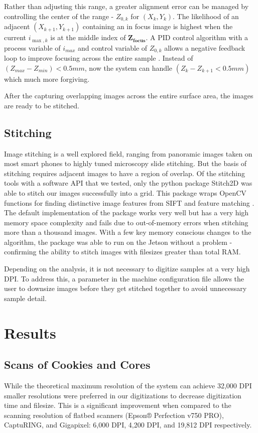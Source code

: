 \documentclass[a4paper,12pt]{article}
\begin{document}
Rather than adjusting this range, a greater alignment error can be managed by controlling the center of the range - $Z_{0,k}$ for $(X_k,Y_k)$. 
The likelihood of an adjacent $(X_{k+1}, Y_{k+1})$ containing an in focus image is highest when the current $i_{{\max,k}}$ is at the middle index of $\boldsymbol{Z_{focus}}$. 
A PID control algorithm with a process variable of $i_{max}$ and control variable of $Z_{0,k}$ allows a negative feedback loop to improve focusing across the entire sample \citep{odwyer_summary_2000}. 
Instead of $(Z_{max} - Z_{min}) < 0.5mm$, now the system can handle $(Z_{k} - Z_{k+1} < 0.5mm)$ which much more forgiving. 

After the capturing overlapping images across the entire surface area, the images are ready to be stitched.

\subsection{Stitching}

Image stitching is a well explored field, ranging from panoramic images taken on most smart phones to highly tuned microscopy slide stitching. 
But the basis of stitching requires adjacent images to have a region of overlap. 
Of the stitching tools with a software API that we tested, only the python package Stitch2D was able to stitch our images successfully into a grid. %
This package wraps OpenCV functions for finding distinctive image features from SIFT and feature matching \citep{lowe_distinctive_2004}. 
The default implementation of the package works very well but has a very high memory space complexity and fails due to out-of-memory errors when stitching more than a thousand images. %
With a few key memory conscious changes to the algorithm, the package was able to run on the Jetson without a problem - confirming the ability to stitch images with filesizes greater than total RAM. 

Depending on the analysis, it is not necessary to digitize samples at a very high DPI. To address this, a parameter in the machine configuration file 
allows the user to downsize images before they get stitched together to avoid unnecessary sample detail. 

\section{Results}
\subsection{Scans of Cookies and Cores}
While the theoretical maximum resolution of the system can achieve 32,000 DPI smaller resolutions were preferred in our digitizations to decrease digitization time and filesize.
This is a significant improvement when compared to the scanning resolution of flatbed scanners (Epson® Perfection v750 PRO), CaptuRING, and Gigapixel: 6,000 DPI, 4,200 DPI, and 19,812 DPI respectively.
\end{document}
